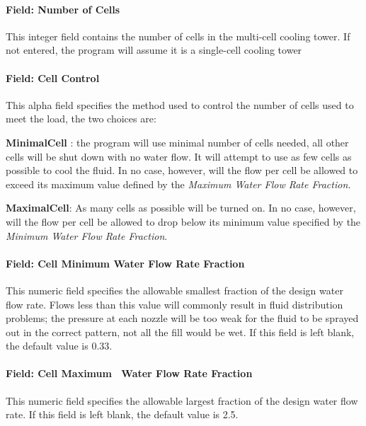 \paragraph{Field: Number of Cells}\label{field-number-of-cells}

This integer field contains the number of cells in the multi-cell cooling tower. If not entered, the program will assume it is a single-cell cooling tower

\paragraph{Field: Cell Control}\label{field-cell-control}

This alpha field specifies the method used to control the number of cells used to meet the load, the two choices are:

\textbf{MinimalCell} : the program will use minimal number of cells needed, all other cells will be shut down with no water flow. It will attempt to use as few cells as possible to cool the fluid. In no case, however, will the flow per cell be allowed to exceed its maximum value defined by the \emph{Maximum Water Flow Rate Fraction.}

\textbf{MaximalCell}: As many cells as possible will be turned on. In no case, however, will the flow per cell be allowed to drop below its minimum value specified by the \emph{Minimum Water Flow Rate Fraction}.

\paragraph{Field: Cell Minimum Water Flow Rate Fraction}\label{field-cell-minimum-water-flow-rate-fraction}

This numeric field specifies the allowable smallest fraction of the design water flow rate. Flows less than this value will commonly result in fluid distribution problems; the pressure at each nozzle will be too weak for the fluid to be sprayed out in the correct pattern, not all the fill would be wet. If this field is left blank, the default value is 0.33.

\paragraph{Field: Cell Maximum~ Water Flow Rate Fraction}\label{field-cell-maximum-water-flow-rate-fraction}

This numeric field specifies the allowable largest fraction of the design water flow rate. If this field is left blank, the default value is 2.5.

